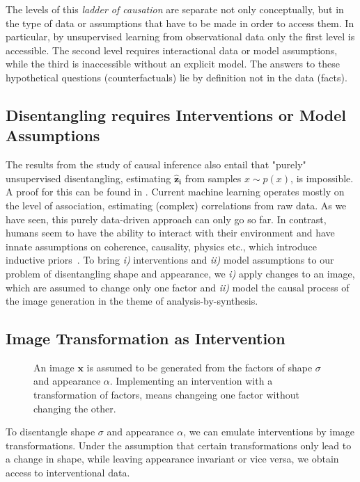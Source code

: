 		The levels of this \textit{ladder of causation} \cite{pearl18why, pearl18impediments} are separate not only conceptually, but in the type of data or assumptions that have to be made in order to access them. In particular, by unsupervised learning from observational data only the first level is accessible. The second level requires interactional data or model assumptions, while the third is inaccessible without an explicit model. The answers to these hypothetical questions (counterfactuals) lie by definition not in the data (facts).




	\subsection{Disentangling requires Interventions or Model Assumptions}\label{sec:requirements}
		The results from the study of causal inference also entail that "purely" unsupervised disentangling, \ie estimating $\mathbf{\hat z_i}$ from samples $x \sim p(x)$, is impossible. A proof for this can be found in \cite{locatello18challenging}.
		Current machine learning operates mostly on the level of association, estimating (complex) correlations from raw data.
		As we have seen, this purely data-driven approach can only go so far.
		In contrast, humans seem to have the ability to interact with their environment and have innate assumptions on coherence, causality, physics etc., which introduce inductive priors~\cite{tenenbaum18think}.
		To bring \emph{i)} interventions and \emph{ii)} model assumptions to our problem of disentangling shape and appearance, we \emph{i)} apply changes to an image, which are assumed to change only one factor and \emph{ii)} model the causal process of the image generation in the theme of analysis-by-synthesis.
%
%
%

	\subsection{Image Transformation as Intervention}\label{sec:transform}
		\begin{figure}[htp]
			\centering
			
			\caption{An image $\mathbf{x}$ is assumed to be generated from the factors of shape $\sigma$ and appearance $\alpha$. Implementing an intervention with a transformation of factors, means changeing one factor without changing the other.}
			\label{fig:intervene}
		\end{figure}
		To disentangle shape $\sigma$ and appearance $\alpha$, we can emulate interventions by image transformations. Under the assumption that certain transformations only lead to a change in shape, while leaving appearance invariant or vice versa, we obtain access to interventional data. %

